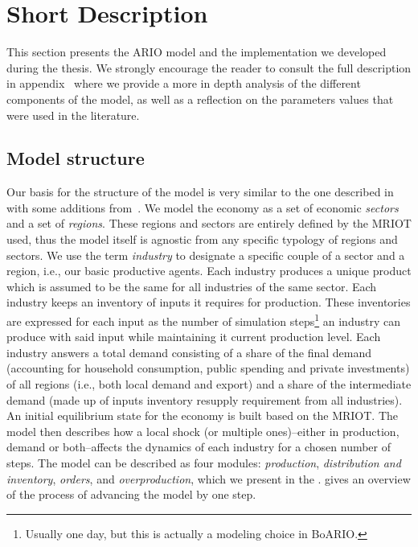 \documentclass[main.tex]{subfiles}
\begin{document}

\section{Short Description}
\label{sec:depth-descr-ario}

This section presents the ARIO model and the implementation we
developed during the thesis. We strongly encourage the reader to consult the full
description in appendix~ where we provide a more
in depth analysis of the different components of the model, as well as a
reflection on the parameters values that were used in the literature.

\subsection{Model structure}
\label{sec:model_struc}

Our basis for the structure of the model is very similar to the one described
in~\textcite{hallegatte-2013-model-role} with some additions
from~\textcite{guan-2020-global-suppl}. We model the economy as a set of economic \emph{sectors}
and a set of \emph{regions}. These regions and sectors are entirely defined by
the \acrfull{MRIOT} used, thus the model itself is agnostic from any specific
typology of regions and sectors. We use the term \emph{industry} to designate a
specific couple of a sector and a region, i.e., our basic productive agents.
Each industry produces a unique product which is assumed to be the same for all
industries of the same sector. Each industry keeps an inventory of inputs it
requires for production. These inventories are expressed for each
input as the number of simulation steps\footnote{Usually one day, but this is
  actually a modeling choice in BoARIO.} an industry can produce with said input
while maintaining it current production level. Each industry answers a total demand consisting of a
share of the final demand (accounting for household consumption, public spending
and private investments) of all regions (i.e., both local demand and export) and
a share of the intermediate demand (made up of inputs inventory resupply
requirement from all industries). An initial equilibrium state for the economy is built based on
the MRIOT. The model then describes how a local
shock (or multiple ones)--either in production, demand or both--affects the
dynamics of each industry for a chosen number of steps. The model can be
described as four modules: \emph{production}, \emph{distribution and inventory},
\emph{orders}, and \emph{overproduction}, which we present in the
.  gives an overview
of the process of advancing the model by one step.
\end{document}
